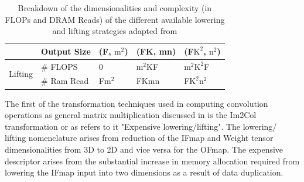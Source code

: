 \begin{table}[!ht]
\begin{tabular}{ll|l|l|l|}
        \multicolumn{1}{|l|}{}                                                                            & Output Size         & (F, $\text{m}^2$)                                                        & (FK, mn)                                                                    & (F$\text{K}^2$, $\text{n}^2$)                                          \\ \hline
        \multicolumn{1}{|l|}{\multirow{2}{*}{Lifting}}                                                    & \# FLOPS            & 0                                                                        & $\text{m}^2$KF                                                              & $\text{m}^2$$\text{K}^2$F                                              \\ \cline{2-5} 
        \multicolumn{1}{|l|}{}                                                                            & \# Ram Read         & F$\text{m}^2$                                                            & FKmn                                                                        & F$\text{K}^2$$\text{n}^2$                                              \\ \hline
    \end{tabular}
\label{Table:lowering_lifting_breakdown}
    \caption{Breakdown of the dimensionalities and complexity (in FLOPs and DRAM Reads) of the different available lowering and lifting strategies adapted from \cite{cafe_con_troll}}
\end{table}

The first of the transformation techniques used in computing convolution
operations as general matrix multiplication discussed in \cite{cafe_con_troll}
is the Im2Col transformation or as \cite{cafe_con_troll} refers to it
"Expensive lowering/lifting". The lowering/ lifting nomenclature arises from
reduction of the IFmap and Weight tensor dimensionalities from 3D to 2D and vice
versa for the OFmap. The expensive descriptor arises from the substantial
increase in memory allocation required from lowering the IFmap input into two
dimensions as a result of data duplication. 

